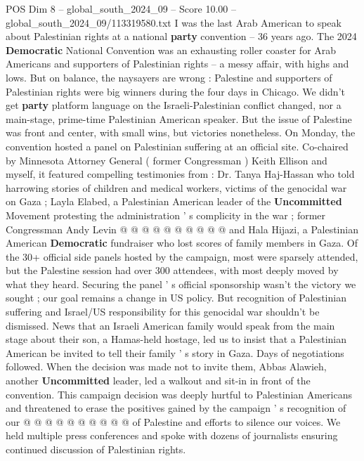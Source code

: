 \begin{textsample}{POS Dim 8 – global\_south\_2024\_09 – Score 10.00 – global\_south\_2024\_09/113319580.txt}  \label{ex:f8_pos_250}
I was the last Arab American to speak about Palestinian rights at a national \textbf{party} convention -- 36 years ago.
The 2024 \textbf{Democratic} National Convention was an exhausting roller coaster for Arab Americans and supporters of Palestinian rights -- a messy affair, with highs and lows.
But on balance, the naysayers are wrong : Palestine and supporters of Palestinian rights were big winners during the four days in Chicago.
We didn't get \textbf{party} platform language on the Israeli-Palestinian conflict changed, nor a main-stage, prime-time Palestinian American speaker.
But the issue of Palestine was front and center, with small wins, but victories nonetheless.
On Monday, the convention hosted a panel on Palestinian suffering at an official site.
Co-chaired by Minnesota Attorney General ( former Congressman ) Keith Ellison and myself, it featured compelling testimonies from : Dr.
Tanya Haj-Hassan who told harrowing stories of children and medical workers, victims of the genocidal war on Gaza ; Layla Elabed, a Palestinian American leader of the \textbf{Uncommitted} Movement protesting the administration ' s complicity in the war ; former Congressman Andy Levin @ @ @ @ @ @ @ @ @ @ and Hala Hijazi, a Palestinian American \textbf{Democratic} fundraiser who lost scores of family members in Gaza.
Of the 30+ official side panels hosted by the campaign, most were sparsely attended, but the Palestine session had over 300 attendees, with most deeply moved by what they heard.
Securing the panel ' s official sponsorship wasn't the victory we sought ; our goal remains a change in US policy.
But recognition of Palestinian suffering and Israel/US responsibility for this genocidal war shouldn't be dismissed.
News that an Israeli American family would speak from the main stage about their son, a Hamas-held hostage, led us to insist that a Palestinian American be invited to tell their family ' s story in Gaza.
Days of negotiations followed.
When the decision was made not to invite them, Abbas Alawieh, another \textbf{Uncommitted} leader, led a walkout and sit-in in front of the convention.
This campaign decision was deeply hurtful to Palestinian Americans and threatened to erase the positives gained by the campaign ' s recognition of our @ @ @ @ @ @ @ @ @ @ of Palestine and efforts to silence our voices.
We held multiple press conferences and spoke with dozens of journalists ensuring continued discussion of Palestinian rights.

\end{textsample}
